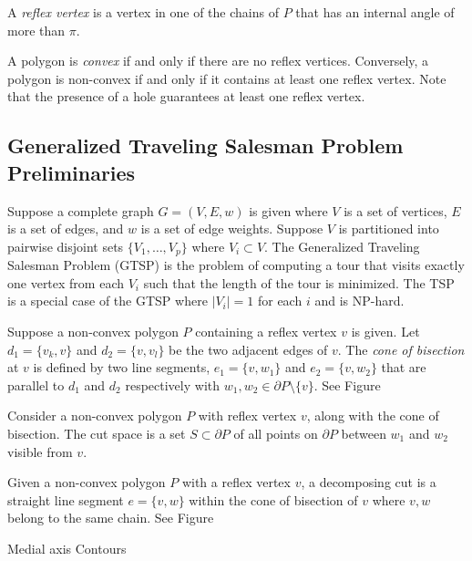 \documentclass[../main.tex]{subfiles}
\begin{document}
\begin{definition}
A \emph{reflex vertex} is a vertex in one of the chains of $P$ that has an internal angle of more than $\pi$.
\end{definition}

\begin{definition}
A polygon is \emph{convex} if and only if there are no reflex vertices. Conversely, a polygon is non-convex if and only if it contains at least one reflex vertex. Note that the presence of a hole guarantees at least one reflex vertex.
\end{definition}

\subsection{Generalized Traveling Salesman Problem Preliminaries}
Suppose a complete graph $G=(V,E,w)$ is given where $V$ is a set of vertices, $E$ is a set of edges, and $w$ is a set of edge weights. Suppose $V$ is partitioned into pairwise disjoint sets $\{V_1,\ldots,V_p\}$ where $V_i\subset V$. The Generalized Traveling Salesman Problem (GTSP) is the problem of computing a tour that visits exactly one vertex from each $V_i$ such that the length of the tour is minimized. The TSP is a special case of the GTSP where $|V_i|=1$ for each $i$ and is NP-hard.

\begin{definition}[Altitude]

\end{definition}

\begin{definition}
\label{def:cone_of_bisection}
Suppose a non-convex polygon $P$ containing a reflex vertex $v$ is given. Let $d_1=\{v_k, v\}$ and $d_2=\{v, v_l\}$ be the two adjacent edges of $v$. The \emph{cone of bisection} at $v$ is defined by two line segments, $e_1=\{v, w_1\}$ and $e_2=\{v, w_2\}$ that are parallel to $d_1$ and $d_2$ respectively with $w_1, w_2\in{\partial P\setminus\{v\}}$. See Figure%
\end{definition}

\begin{definition}
\label{def:cut_space}
Consider a non-convex polygon $P$ with reflex vertex $v$, along with the cone of bisection. The cut space is a set $S\subset\partial P$ of all points on $\partial P$ between $w_1$ and $w_2$ visible from $v$.
\end{definition}

\begin{definition}
\label{def:decomposing_cut}
Given a non-convex polygon $P$ with a reflex vertex $v$, a decomposing cut is a straight line segment $e=\{v,w\}$ within the cone of bisection of $v$ where $v,w$ belong to the same chain. See Figure~%
\end{definition}

Medial axis
Contours
\end{document}
